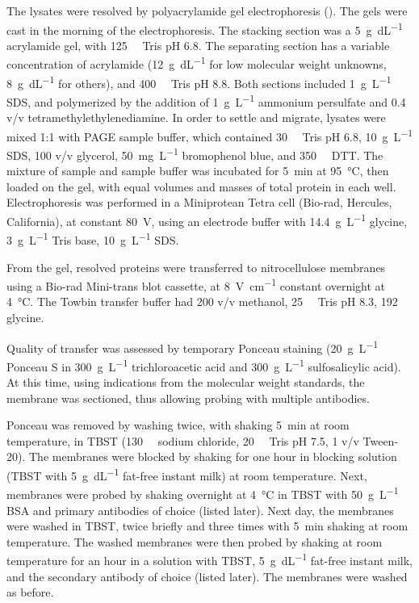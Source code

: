 \documentclass[12pt,english]{report}\usepackage[]{graphicx}\usepackage[]{color}
\begin{document}
The lysates were resolved by polyacrylamide gel electrophoresis ().
The gels were cast in the morning of the electrophoresis. The stacking
section was a \SI{5}{\gram\per\deci\liter} acrylamide gel, with \SI{125}{\milli\molar}
Tris pH 6.8. The separating section has a variable concentration of
acrylamide (\SI{12}{\gram\per\deci\liter} for low molecular weight
unknowns, \SI{8}{\gram\per\deci\liter} for others), and \SI{400}{\milli\molar}
Tris pH 8.8. Both sections included \SI{1}{\gram\per\liter} SDS,
and polymerized by the addition of \SI{1}{\gram\per\liter} ammonium
persulfate and \SI{0.4}{\promille} v/v tetramethylethylenediamine.
In order to settle and migrate, lysates were mixed 1:1 with PAGE sample
buffer, which contained \SI{30}{\milli\molar} Tris pH 6.8, \SI{10}{\gram\per\liter}
SDS, \SI{100}{\promille} v/v glycerol, \SI{50}{\milli\gram\per\liter}
bromophenol blue, and \SI{350}{\milli\molar} DTT. The mixture of
sample and sample buffer was incubated for \SI{5}{\minute} at \SI{95}{\celsius},
then loaded on the gel, with equal volumes and masses of total protein
in each well. Electrophoresis was performed in a Miniprotean Tetra
cell (Bio-rad, Hercules, California), at constant \SI{80}{\volt},
using an electrode buffer with \SI{14.4}{\gram\per\liter} glycine,
\SI{3}{\gram\per\liter} Tris base, \SI{10}{\gram\per\liter} SDS.

From the gel, resolved proteins were transferred to nitrocellulose
membranes using a Bio-rad Mini-trans blot cassette, at \SI{8}{\volt\per\centi\meter}
constant overnight at \SI{4}{\celsius}. The Towbin transfer buffer
had \SI{200}{\promille} v/v methanol, \SI{25}{\milli\molar} Tris
pH 8.3, \SI{192}{\milli\molar} glycine.

Quality of transfer was assessed by temporary Ponceau staining (\SI{20}{\gram\per\liter}
Ponceau S in \SI{300}{\gram\per\liter} trichloroacetic acid and \SI{300}{\gram\per\liter}
sulfosalicylic acid). At this time, using indications from the molecular
weight standards, the membrane was sectioned, thus allowing probing
with multiple antibodies.

Ponceau was removed by washing twice, with shaking \SI{5}{\minute}
at room temperature, in TBST (\SI{130}{\milli\molar} sodium chloride,
\SI{20}{\milli\molar} Tris pH 7.5, \SI{1}{\promille} v/v Tween-20).
The membranes were blocked by shaking for one hour in blocking solution
(TBST with \SI{5}{\gram\per\deci\liter} fat-free instant milk) at
room temperature. Next, membranes were probed by shaking overnight
at \SI{4}{\celsius} in TBST with \SI{50}{\gram\per\liter} BSA and
primary antibodies of choice (listed later). Next day, the membranes
were washed in TBST, twice briefly and three times with \SI{5}{\minute}
shaking at room temperature. The washed membranes were then probed
by shaking at room temperature for an hour in a solution with TBST,
\SI{5}{\gram\per\deci\liter} fat-free instant milk, and the secondary
antibody of choice (listed later). The membranes were washed as before.
\end{document}
